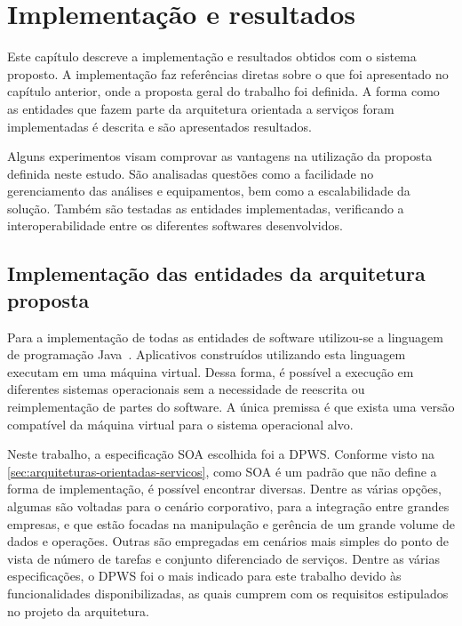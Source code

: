 \chapter{Implementação e resultados}

Este capítulo descreve a implementação e resultados obtidos com o sistema proposto. A implementação
faz referências diretas sobre o que foi apresentado no capítulo anterior, onde a proposta geral do
trabalho foi definida. A forma como as entidades que fazem parte da arquitetura orientada a serviços
foram implementadas é descrita e são apresentados resultados.

Alguns experimentos visam comprovar as vantagens na utilização da proposta definida neste estudo.
São analisadas questões como a facilidade no gerenciamento das análises e equipamentos, bem como a
escalabilidade da solução. Também são testadas as entidades implementadas, verificando a
interoperabilidade entre os diferentes softwares desenvolvidos.


\section{Implementação das entidades da arquitetura proposta}

Para a implementação de todas as entidades de software utilizou-se a linguagem de programação
Java~\cite{java2013homepage}. Aplicativos construídos utilizando esta linguagem executam em uma
máquina virtual. Dessa forma, é possível a execução em diferentes sistemas operacionais sem a
necessidade de reescrita ou reimplementação de partes do software. A única premissa é que exista uma
versão compatível da máquina virtual para o sistema operacional alvo.

Neste trabalho, a especificação \gls{SOA} escolhida foi a \gls{DPWS}. Conforme visto na
\cref{sec:arquiteturas-orientadas-servicos}, como \gls{SOA} é um padrão que não define a forma de
implementação, é possível encontrar diversas. Dentre as várias opções, algumas são voltadas para o
cenário corporativo, para a integração entre grandes empresas, e que estão focadas na manipulação e
gerência de um grande volume de dados e operações. Outras são empregadas em cenários mais simples do
ponto de vista de número de tarefas e conjunto diferenciado de serviços. Dentre as várias
especificações, o \gls{DPWS} foi o mais indicado para este trabalho devido às funcionalidades
disponibilizadas, as quais cumprem com os requisitos estipulados no projeto da arquitetura.

